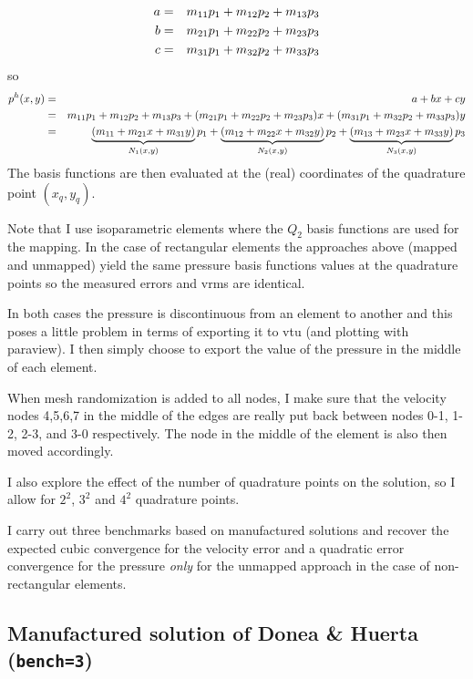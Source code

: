 \begin{eqnarray}
a &=& m_{11}p_1 + m_{12} p_2 + m_{13} p_3 \nonumber\\
b &=& m_{21}p_1 + m_{22} p_2 + m_{23} p_3 \nonumber\\
c &=& m_{31}p_1 + m_{32} p_2 + m_{33} p_3 \nonumber
\end{eqnarray}
so 
\begin{eqnarray}
p^h(x,y) 
&=&  a+bx+cy \nonumber\\
&=& m_{11}p_1 + m_{12} p_2 + m_{13} p_3
+ (m_{21}p_1 + m_{22} p_2 + m_{23} p_3) x
+ (m_{31}p_1 + m_{32} p_2 + m_{33} p_3) y \nonumber\\
&=& \underbrace{(m_{11} + m_{21}x + m_{31}y)}_{N_1(x,y)} p_1 
+   \underbrace{(m_{12} + m_{22}x + m_{32}y)}_{N_2(x,y)} p_2 
+   \underbrace{(m_{13} + m_{23}x + m_{33}y)}_{N_3(x,y)} p_3
\end{eqnarray}
The basis functions are then evaluated at the (real) coordinates 
of the quadrature point $(x_q,y_q)$.

Note that I use isoparametric elements where the $Q_2$ basis 
functions are used for the mapping. In the case of 
rectangular elements the approaches above (mapped and unmapped)
yield the same pressure basis functions values at the quadrature points
so the measured errors and vrms are identical. 


In both cases the pressure is discontinuous from an element to another and
this poses a little problem in terms of exporting it to vtu (and plotting with paraview).
I then simply choose to export the value of the pressure in the middle of 
each element. 

When mesh randomization is added to all nodes, I make sure that the velocity 
nodes 4,5,6,7 in the middle of the edges 
are really put back between nodes 0-1, 1-2, 2-3, and 3-0 respectively. The node in the middle of the element
is also then moved accordingly. 

I also explore the effect of the number of quadrature points on the solution, 
so I allow for $2^2$, $3^2$ and $4^2$ quadrature points. 

I carry out three benchmarks based on manufactured solutions  
and recover the expected cubic convergence for the velocity error 
and a quadratic error convergence for the pressure \textit{only} for the unmapped approach
in the case of non-rectangular elements.



\subsection*{Manufactured solution of Donea \& Huerta ({\tt bench=3})}

